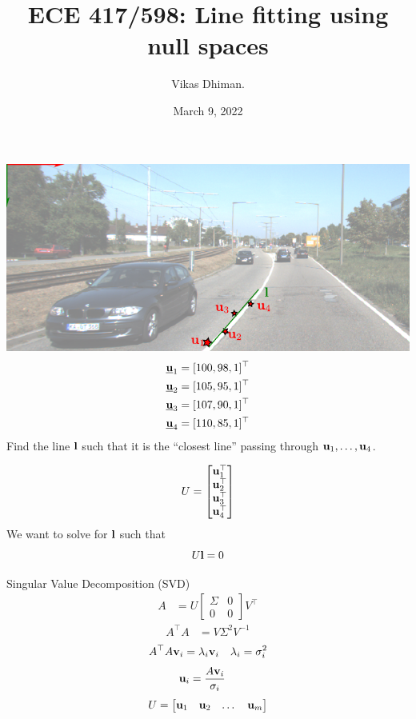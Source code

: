 \documentclass[times,t]{beamer}
\title{ECE 417/598: Line fitting using null spaces}
\author{Vikas Dhiman.  }
\date{March 9, 2022}
\begin{document}
\newcommand{\ubfu}{\underline{\bfu}}
\begin{frame}
  \titlepage
  \end{frame}
\begin{frame}
  \includegraphics[width=\linewidth]{media/lane-from-points.pdf}
  \begin{align*}
    \ubfu_1 &= [100, 98, 1]^\top\\
    \ubfu_2 &= [105, 95, 1]^\top\\
    \ubfu_3 &= [107, 90, 1]^\top\\
    \ubfu_4 &= [110, 85, 1]^\top
    \end{align*}
    Find  the line $\mathbf{l}$ such that it is the ``closest line'' passing through
    $\mathbf{u}_1, \dots, \mathbf{u}_4$.
\end{frame}

\begin{frame}
  \[
  U = \begin{bmatrix}\mathbf{u}_1^\top  \\
    \mathbf{u}_2^\top \\
    \mathbf{u}_3^\top \\
    \mathbf{u}_4^\top
  \end{bmatrix}
  \]
  We want to solve for $\mathbf{l}$ such that
  \[
    U \mathbf{l} = 0
  \]
\end{frame}

\begin{frame}{Singular Value  Decomposition (SVD)}
  \begin{align*}
    A  &=   U  \begin{bmatrix}\Sigma   &  0  \\   0  &  0 \end{bmatrix} V^\top
  \end{align*}
  \begin{align*}
    A^\top A &= V \Sigma^2  V^{-1}
  \end{align*}
  \begin{align*}
    A^\top A \mathbf{v}_i  &= \lambda_i \mathbf{v}_i & \lambda_i = \sigma_i^2\\
  \end{align*}
  \begin{align*}
    \mathbf{u}_i   &=  \frac{A\mathbf{v}_i}{\sigma_i}
    \end{align*}
    \begin{align*}
      U = \begin{bmatrix}
        \mathbf{u}_1 & \mathbf{u}_2 & \dots & \mathbf{u}_m
      \end{bmatrix}
    \end{align*}
\end{frame}
\end{document}
